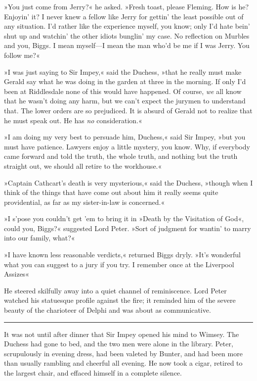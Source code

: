 »You just come from Jerry?« he asked. »Fresh toast, please Fleming. How is he? Enjoyin' it? I never knew a fellow like Jerry for gettin' the least possible out of any situation. I'd rather like the experience myself, you know; only I'd hate bein' shut up and watchin' the other idiots bunglin' my case. No reflection on Murbles and you, Biggs. I mean myself\allowbreak---\allowbreak I mean the man who'd be me if I was Jerry. You follow me?«

»I was just saying to Sir Impey,« said the Duchess, »that he really must make Gerald say what he was doing in the garden at three in the morning. If only I'd been at Riddlesdale none of this would have happened. Of course, \textit{we} all know that he wasn't doing any harm, but we can't expect the jurymen to understand that. The lower orders are so prejudiced. It is absurd of Gerald not to realize that he must speak out. He has \textit{no} consideration.«

»I am doing my very best to persuade him, Duchess,« said Sir Impey, »but you must have patience. Lawyers enjoy a little mystery, you know.  Why, if everybody came forward and told the truth, the whole truth, and nothing but the truth straight out, we should all retire to the workhouse.«

»Captain Cathcart's death is very mysterious,« said the Duchess, »though when I think of the things that have come out about him it really seems quite providential, as far as my sister-in-law is concerned.«

»I s'pose you couldn't get 'em to bring it in »Death by the Visitation of God«, could you, Biggs?« suggested Lord Peter. »Sort of judgment for wantin' to marry into our family, what?«

»I have known less reasonable verdicts,« returned Biggs dryly. »It's wonderful what you can suggest to a jury if you try. I remember once at the Liverpool Assizes\longdash«

He steered skilfully away into a quiet channel of reminiscence. Lord Peter watched his statuesque profile against the fire; it reminded him of the severe beauty of the charioteer of Delphi and was about as communicative.

\noindent\hfil\rule{0.5\textwidth}{.4pt}\hfil

It was not until after dinner that Sir Impey opened his mind to Wimsey.  The Duchess had gone to bed, and the two men were alone in the library.  Peter, scrupulously in evening dress, had been valeted by Bunter, and had been more than usually rambling and cheerful all evening. He now took a cigar, retired to the largest chair, and effaced himself in a complete silence.


